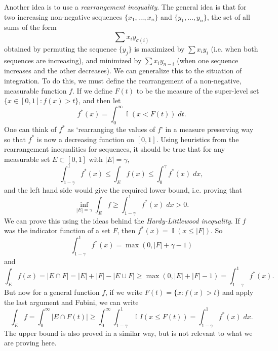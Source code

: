 \documentclass[answers]{exam}
\DeclareMathOperator{\II}{\mathbb{I}}
\begin{document}
\begin{questions}
\begin{solution}
	Another idea is to use a \emph{rearrangement inequality}. The general idea is that for two increasing non-negative sequences $\{ x_1, \dots, x_n \}$ and $\{ y_1,\dots, y_n \}$, the set of all sums of the form
	\[ \sum x_i y_{\sigma(i)} \]
	obtained by permuting the sequence $\{ y_j \}$ is maximized by $\sum x_i y_i$ (i.e. when both sequences are increasing), and minimized by $\sum x_i y_{n-i}$ (when one sequence increases and the other decreases). We can generalize this to the situation of integration. To do this, we must define the rearrangement of a non-negative, measurable function $f$. If we define $F(t)$ to be the measure of the super-level set $\{ x \in [0,1] : f(x) > t \}$, and then let
	\[ f^*(x) = \int_0^\infty \II(x < F(t))\; dt. \]
	One can think of $f^*$ as `rearranging the values of $f$' in a measure preserving way so that $f^*$ is now a decreasing function on $[0,1]$. Using heuristics from the rearrangement inequalities for sequences, it should be true that for any measurable set $E \subset [0,1]$ with $|E| = \gamma$,
	\[ \int_{1 - \gamma}^1 f^*(x) \leq \int_E f(x) \leq \int_0^\gamma f^*(x)\; dx, \]
	and the left hand side would give the required lower bound, i.e. proving that
	\[ \inf_{|E| = \gamma} \int_E f \geq \int_{1 - \gamma}^1 f^*(x)\; dx > 0. \]
	We can prove this using the ideas behind the \emph{Hardy-Littlewood inequality}. If $f$ was the indicator function of a set $F$, then $f^*(x) = \II(x \leq |F|)$. So
	\[ \int_{1 - \gamma}^1 f^*(x) = \max(0,|F| + \gamma - 1) \]
	and
	\[ \int_E f(x) = |E \cap F| = |E| + |F| - |E \cup F| \geq \max(0,|E| + |F| - 1) = \int_{1 - \gamma}^1 f^*(x). \]
	But now for a general function $f$, if we write $F(t) = \{ x : f(x) > t \}$ and apply the last argument and Fubini, we can write
	\[ \int_E f = \int_0^\infty |E \cap F(t)| \geq \int_0^\infty \int_{1 - \gamma}^1 \II{I}(x \leq F(t)) = \int_{1 - \gamma}^1 f^*(x)\; dx. \]
	The upper bound is also proved in a similar way, but is not relevant to what we are proving here.
\end{solution}


\end{questions}
\end{document}

